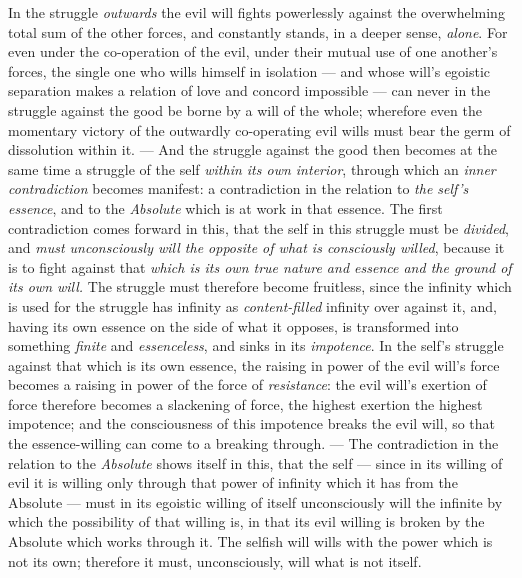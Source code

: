 \documentclass[12pt,a4paper]{book}
\begin{document}
In the struggle \emph{outwards} the evil will fights powerlessly against the
overwhelming total sum of the other forces, and constantly stands, in a deeper
sense, \emph{alone}. For even under the co-operation of the evil, under their
mutual use of one another's forces, the single one who wills himself in
isolation --- and whose will's egoistic separation makes a relation of love and
concord impossible --- can never in the struggle against the good be borne by a
will of the whole; wherefore even the momentary victory of the outwardly
co-operating evil wills
must bear the germ of dissolution within it. --- And the struggle against the
good then becomes at the same time a struggle of the self \emph{within its own
interior}, through which an \emph{inner contradiction} becomes manifest: a
contradiction in the relation to \emph{the self's essence}, and to the
\emph{Absolute} which is at work in that essence. The first contradiction comes
forward in this, that the self in this struggle must be \emph{divided}, and
\emph{must unconsciously will the opposite of what is consciously willed},
because it is to fight against that \emph{which is its own true nature and
essence and the ground of its own will.} The struggle must therefore become
fruitless, since the infinity which is used for the struggle has infinity as
\emph{content-filled} infinity over against it, and, having its own essence on
the side of what it opposes, is transformed into something \emph{finite} and
\emph{essenceless}, and sinks in its \emph{impotence}. In the self's struggle
against that which is its own essence, the raising in power of the evil will's
force becomes a raising in power of the force of \emph{resistance}: the evil
will's exertion of force therefore becomes a slackening of force, the highest
exertion the highest impotence; and the consciousness of this impotence breaks
the evil will, so that the essence-willing can come to a breaking through. ---
The contradiction in the relation to the \emph{Absolute} shows itself in this,
that the self --- since in its willing of evil it is willing only through that
power of infinity which it has from the Absolute --- must in its egoistic
willing of itself unconsciously will the infinite by which the possibility of
that willing is, in that its evil willing is broken by the Absolute which works
through it. The selfish will wills with the power which is not its own;
therefore it must, unconsciously, will what is not itself.
\end{document}
